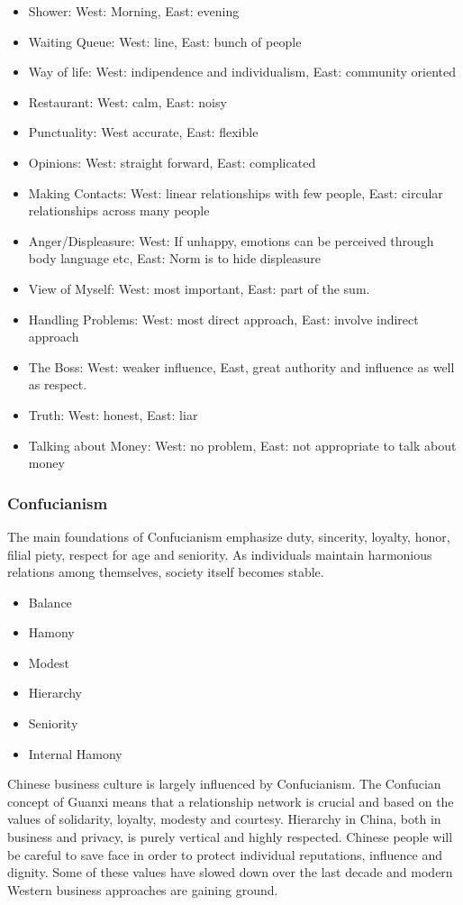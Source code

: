 \begin{itemize}
    \item Shower: West: Morning, East: evening
    \item Waiting Queue: West: line, East: bunch of people
    \item Way of life: West: indipendence and individualism, East: community oriented
    \item Restaurant: West: calm, East: noisy
    \item Punctuality: West accurate, East: flexible
    \item Opinions: West: straight forward, East: complicated
    \item Making Contacts: West: linear relationships with few people, East: circular relationships across many people
    \item Anger/Displeasure: West: If unhappy, emotions can be perceived through body language etc,
        East: Norm is to hide displeasure
    \item View of Myself: West: most important, East: part of the sum.
    \item Handling Problems: West: most direct approach, East: involve indirect approach
    \item The Boss: West: weaker influence, East, great authority and influence as well as respect.
    \item Truth: West: honest, East: liar
    \item Talking about Money: West: no problem, East: not appropriate to talk about money
\end{itemize}

\subsubsection{Confucianism}
The main foundations of Confucianism emphasize duty, sincerity, loyalty,
honor, filial piety, respect for age and seniority. As individuals maintain
harmonious relations among themselves, society itself becomes stable.
\begin{itemize}
    \item Balance
    \item Hamony
    \item Modest
    \item Hierarchy
    \item Seniority
    \item Internal Hamony
\end{itemize}
Chinese business culture is largely influenced by Confucianism.
The Confucian concept of Guanxi means that a relationship network is crucial
and based on the values of solidarity, loyalty, modesty and courtesy.
Hierarchy in China, both in business and privacy, is purely vertical and highly
respected. Chinese people will be careful to save face in order to protect
individual reputations, influence and dignity. Some of these values have
slowed down over the last decade and modern Western business approaches are
gaining ground.

